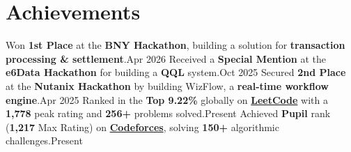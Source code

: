 \section{Achievements}
    \resumeSubHeadingListStart
      \resumeProjectHeading
          {Won \textbf{1st Place} at the \textbf{BNY Hackathon}, building a solution for \textbf{transaction processing \& settlement}.}{Apr 2026}
      \resumeProjectHeading
          {Received a \textbf{Special Mention} at the \textbf{e6Data Hackathon} for building a \textbf{QQL} system.}{Oct 2025}
      \resumeProjectHeading
          {Secured \textbf{2nd Place} at the \textbf{Nutanix Hackathon} by building WizFlow, a \textbf{real-time workflow engine}.}{Apr 2025}
      \resumeProjectHeading
          {Ranked in the \textbf{Top 9.22\%} globally on \textbf{\href{https://leetcode.com}{LeetCode}} with a \textbf{1,778} peak rating and \textbf{256+} problems solved.}{Present}
      \resumeProjectHeading
          {Achieved \textbf{Pupil} rank (\textbf{1,217} Max Rating) on \textbf{\href{https://codeforces.com/profile/saikat_das}{Codeforces}}, solving \textbf{150+} algorithmic challenges.}{Present}
    \resumeSubHeadingListEnd
